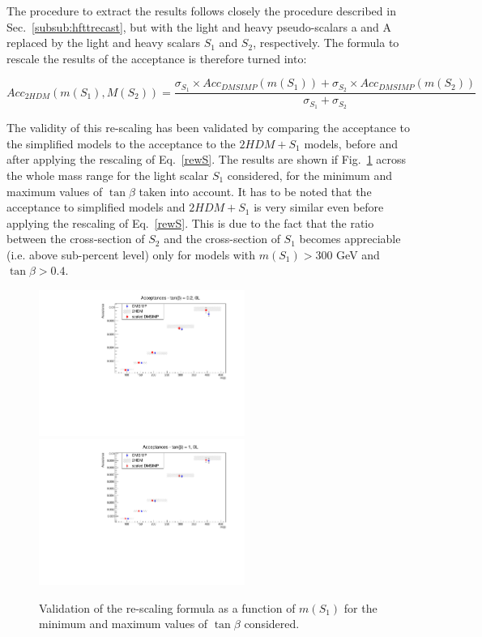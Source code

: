 The procedure to extract the results follows closely the procedure described in Sec.~\ref{subsub:hfttrecast}, 
but with the light and heavy pseudo-scalars a and A replaced by the light and heavy scalars
 $S_1$ and $S_2$, respectively.
The formula to rescale the results of the acceptance is therefore turned into:

\begin{equation}
Acc_{2HDM}(m(S_1),M(S_2))=\frac{\sigma_{S_1} \times Acc_{DMSIMP}(m(S_{1}))+
\sigma_{S_2} \times Acc_{DMSIMP}(m(S_{2}))}{\sigma_{S_1}+\sigma_{S_2}}
\label{rewS}
\end{equation}


The validity of this re-scaling has been validated by comparing the acceptance 
to the simplified models to the acceptance to the $2HDM+S_1$ models, before and 
after applying the rescaling of Eq.~\ref{rewS}. The results are shown if Fig.~\ref{fig:rescS1} across the whole
mass range for the light scalar $S_1$ considered, for the minimum and maximum values of 
$\tan\beta$ taken into account. 
It has to be noted that the acceptance to simplified models and $2HDM+S_1$ is very similar even 
before applying the rescaling of Eq.~\ref{rewS}.
This is due to the fact that the ratio between the cross-section of $S_2$ and the cross-section of $S_1$
becomes appreciable (i.e. above sub-percent level) only for models with $m(S_1)>300$ GeV
 and $\tan\beta > 0.4$.\\

\begin{figure}
  \centering
  \includegraphics[width=0.6\textwidth]{texinputs/04_grid/figures/DMHF/THDMs/rescalingS1tgb02.pdf}
   \includegraphics[width=0.6\textwidth]{texinputs/04_grid/figures/DMHF/THDMs/rescalingS1tgb10.pdf}
\caption{Validation of the re-scaling formula as a function of $m(S_1)$ for the minimum and maximum values of $\tan{\beta}$ considered.}
 \label{fig:rescS1}
\end{figure}

